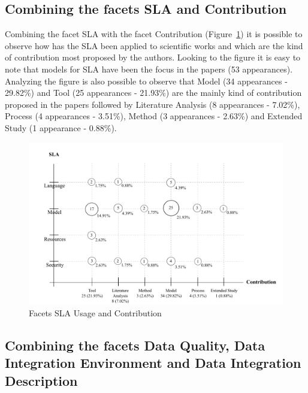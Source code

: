 \subsection{Combining the facets SLA and Contribution}

Combining the facet SLA with the facet Contribution (Figure~\ref{fig:facet3}) it is possible 
to observe how has the SLA been applied to scientific works and which are the kind of contribution 
most proposed by the authors.
Looking to the figure it is easy to note that models for SLA have been the focus in the papers 
(53 appearances).
Analyzing the figure is also possible to observe that Model (34 appearances - 29.82\%) and 
Tool (25 appearances - 21.93\%) are the mainly kind of contribution proposed in the papers 
followed by Literature Analysis (8 appearances - 7.02\%), Process (4 appearances - 3.51\%), 
Method (3 appearances - 2.63\%) and Extended Study (1 appearance - 0.88\%).

\begin{figure}[h!]
\centering
\includegraphics[scale=0.5]{figs/bubble-charts/SLA-Contribution.pdf}
\caption{Facets SLA Usage and Contribution}\label{fig:facet3}
\end{figure}


\subsection{Combining the facets Data Quality, Data Integration Environment and Data Integration Description}

